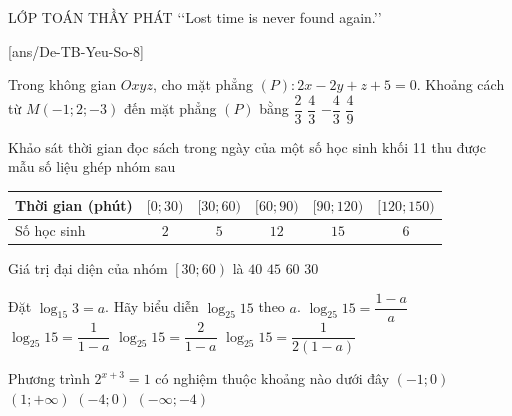 \begin{name}
	{\tenchude}
	{\tendethi}
	{LỚP TOÁN THẦY PHÁT}
	{\lq\lq Lost time is never found again.\rq\rq}
\end{name}

[ans/De-TB-Yeu-So-8]
\TN
\begin{ex}%
Trong không gian $Oxyz$, cho mặt phẳng $(P)\colon 2x-2y+z+5=0$. Khoảng cách từ $M\left(-1;2;-3\right)$ đến mặt phẳng $(P)$ bằng
\choice
{$\dfrac{2}{3}$}
{\True $\dfrac{4}{3}$}
{$-\dfrac{4}{3}$}
{$\dfrac{4}{9}$}
\end{ex}

\begin{ex}%
Khảo sát thời gian đọc sách trong ngày của một số học sinh khối 11 thu được mẫu số liệu ghép nhóm sau
\begin{longtable}{|l|c|c|c|c|c|}
	\hline
	Thời gian (phút) & $[0;30)$ & $[30;60)$ & $[60;90)$ & $[90;120)$ & $[120;150)$ \\ \hline
	Số học sinh&$2$&$5$&$12$&$15$&$6$  \\ 
	\hline
\end{longtable}
Giá trị đại diện của nhóm $\left[30;60\right)$ là
\choice
{$40$}
{\True $45$}
{$60$}
{$30$}
\loigiai{
Giá trị đại diện của nhóm $\left[30;60\right)$ là $\dfrac{30+60}{2}=45$.
}
\end{ex}

\begin{ex}%
Đặt $\log _{15}3=a$. Hãy biểu diễn $\log _{25}15$ theo $a$.
\choice
{$\log _{25}15=\dfrac{1-a}{a}$}
{$\log _{25}15=\dfrac{1}{1-a}$}
{$\log _{25}15=\dfrac{2}{1-a}$}
{\True $\log _{25}15=\dfrac{1}{2\left(1-a\right)}$}
\end{ex}

\begin{ex}%
Phương trình $2^{x+3}=1$ có nghiệm thuộc khoảng nào dưới đây
\choice
{$\left(-1;0\right)$}
{$\left(1;+\infty\right)$}
{\True $\left(-4;0\right)$}
{$\left(-\infty;-4\right)$}
\end{ex}

